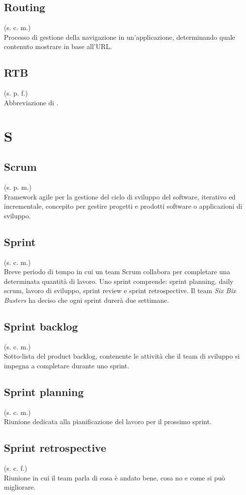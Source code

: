 \subsection{Routing}
(s. c. m.)\\
Processo di gestione della navigazione in un'applicazione, determinando quale contenuto mostrare in base all'URL.
\subsection{RTB}
(s. p. f.)\\
Abbreviazione di .
\pagebreak
\section{S}
\subsection{Scrum}
(s. p. m.)\\
Framework agile per la gestione del ciclo di sviluppo del software,
iterativo ed incrementale, concepito per gestire progetti e prodotti software
o applicazioni di sviluppo.
\subsection{Sprint}
\label{Sprint}
(s. c. m.)\\
Breve periodo di tempo in cui un team Scrum collabora per completare
una determinata quantità di lavoro. Uno sprint comprende:
sprint planning, daily scrum, lavoro di sviluppo,
sprint review e sprint retrospective. Il team \textit{Six Bix Busters} ha
deciso che ogni sprint durerà due settimane.
\subsection{Sprint backlog}
\label{Sprint backlog}
(s. c. m.)\\
Sotto-lista del product backlog, contenente le attività che il team di sviluppo
si impegna a completare durante uno sprint.
\subsection{Sprint planning}
(s. c. m.)\\
Riunione dedicata alla pianificazione del lavoro per il prossimo sprint.
\subsection{Sprint retrospective}
\label{Sprint retrospective}
(s. c. f.)\\
Riunione in cui il team parla di cosa è andato bene, cosa no e come si può migliorare.

